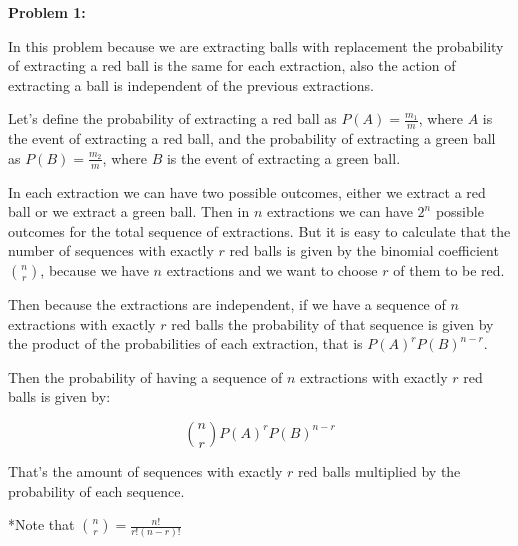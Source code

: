 \textbf{Problem 1:}

\singlespacing

In this problem because we are extracting balls with replacement
the probability of extracting a red ball is the same for each extraction, also
the action of extracting a ball is independent of the previous extractions.

\singlespacing

Let's define the probability of extracting a red ball as $P(A) = \frac{m_1}{m}$, where
$A$ is the event of extracting a red ball, and the probability of extracting a green ball as $P(B) = \frac{m_2}{m}$, where
$B$ is the event of extracting a green ball.

\singlespacing

In each extraction we can have two possible outcomes, either we extract a red ball
or we extract a green ball. Then in $n$ extractions we can have $2^n$ possible outcomes for
the total sequence of extractions. But it is easy to calculate that the number of sequences
with exactly $r$ red balls is given by the binomial coefficient $\binom{n}{r}$, because
we have $n$ extractions and we want to choose $r$ of them to be red.

\singlespacing

Then because the extractions are independent, if we have a sequence of $n$ extractions
with exactly $r$ red balls the probability of that sequence is given by the product of the
probabilities of each extraction, that is $P(A)^r P(B)^{n-r}$.

\singlespacing

Then the probability of having a sequence of $n$ extractions with exactly $r$ red balls is given by:

\singlespacing

\begin{equation}
    \binom{n}{r} P(A)^r P(B)^{n-r}
\end{equation}

\singlespacing

That's the amount of sequences with exactly $r$ red balls multiplied by the probability of each sequence.

\singlespacing
\singlespacing
\singlespacing

*Note that $\binom{n}{r} = \frac{n!}{r! (n - r)!}$